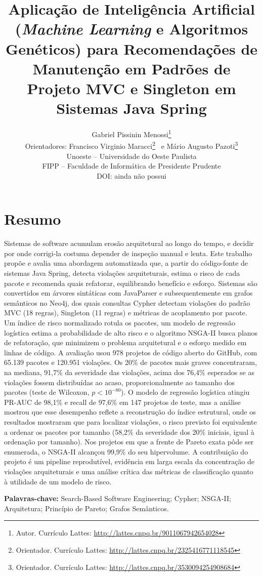 \documentclass[
  a4paper,
]{article}
\title{Aplicação de Inteligência Artificial (\emph{Machine Learning} e Algoritmos Genéticos) para Recomendações de Manutenção em Padrões de Projeto MVC e Singleton em Sistemas Java Spring}
\author{%
  Gabriel Pissinin Menossi\thanks{Autor. Currículo Lattes: \url{http://lattes.cnpq.br/9011067942654028}}\\[2pt]
  {\normalsize Orientadores: Francisco Virginio Maracci\thanks{Orientador. Currículo Lattes: \url{http://lattes.cnpq.br/2325416771118545}}
  \ e Mário Augusto Pazoti\thanks{Orientador. Currículo Lattes: \url{http://lattes.cnpq.br/3530094254908684}}}\\[8pt]
  {\normalsize Unoeste -- Universidade do Oeste Paulista}\\
  {\normalsize FIPP -- Faculdade de Informática de Presidente Prudente}\\
  {\normalsize DOI: ainda não possui}}
\date{}
\begin{document}
\maketitle

\hypertarget{resumo}{%
\section{Resumo}\label{resumo}}

Sistemas de software acumulam erosão arquitetural ao longo do tempo, e decidir por onde corrigi-la costuma depender de inspeção manual e lenta. Este trabalho propõe e avalia uma abordagem automatizada que, a partir do código-fonte de sistemas Java Spring, detecta violações arquiteturais, estima o risco de cada pacote e recomenda quais refatorar, equilibrando benefício e esforço. Sistemas são convertidos em árvores sintáticas com JavaParser e subsequentemente em grafos semânticos no Neo4j, dos quais consultas Cypher detectam violações do padrão MVC (18 regras), Singleton (11 regras) e métricas de acoplamento por pacote. Um índice de risco normalizado rotula os pacotes, um modelo de regressão logística estima a probabilidade de alto risco e o algoritmo NSGA-II busca planos de refatoração, que minimizem o problema arquitetural e o esforço medido em linhas de código. A avaliação usou 978 projetos de código aberto do GitHub, com 65.139 pacotes e 120.951 violações. Os 20\% de pacotes mais graves concentraram, na mediana, 91,7\% da severidade das violações, acima dos 76,4\% esperados se as violações fossem distribuídas ao acaso, proporcionalmente ao tamanho dos pacotes (teste de Wilcoxon, $p < 10^{-80}$). O modelo de regressão logística atingiu PR-AUC de 98,1\% e recall de 97,6\% em 147 projetos de teste, mas a análise mostrou que esse desempenho reflete a reconstrução do índice estrutural, onde os resultados mostraram que para localizar violações, o risco previsto foi equivalente a ordenar os pacotes por tamanho (58,2\% da severidade dos 20\% iniciais, igual à ordenação por tamanho). Nos projetos em que a frente de Pareto exata pôde ser enumerada, o NSGA-II alcançou 99,9\% do seu hipervolume. A contribuição do projeto é um pipeline reprodutível, evidência em larga escala da concentração de violações arquiteturais e uma análise crítica das métricas de classificação quanto à utilidade de um modelo de risco.

\textbf{Palavras-chave:} Search-Based Software Engineering; Cypher; NSGA-II; Arquitetura; Princípio de Pareto; Grafos Semânticos.
\end{document}
